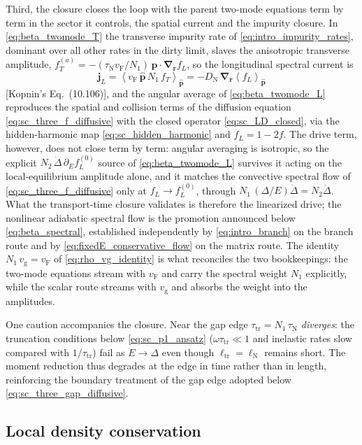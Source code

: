 \documentclass[
  aps,
  prb,
  preprint,
  superscriptaddress,
  longbibliography,
  nofootinbib
]{revtex4-2}
\newcommand{\avg}[1]{\left\langle #1 \right\rangle}
\newcommand{\br}{\mathbf{r}}
\newcommand{\bp}{\mathbf{p}}
\newcommand{\bnabla}{\boldsymbol{\nabla}}
\newcommand{\vF}{v_{\mathrm{F}}}
\newcommand{\vg}{v_{\mathrm{g}}}
\newcommand{\tautr}{\tau_{\mathrm{tr}}}
\newcommand{\elltr}{\ell_{\mathrm{tr}}}
\newcommand{\DOS}{N_1}
\newcommand{\DN}{D_{\mathrm{N}}}
\newcommand{\fL}{f_L}
\newcommand{\fT}{f_T}
\begin{document}
Third, the closure closes the loop with the parent two-mode equations
term by term in the sector it controls, the spatial current and the
impurity closure. In \cref{eq:beta_twomode_T} the transverse impurity rate
of \cref{eq:intro_impurity_rates}, dominant over all other rates in
the dirty limit, slaves the anisotropic transverse amplitude,
\(\fT^{(a)}=-(\tau_{\mathrm N}\vF/\DOS)\,\hat{\bp}\cdot\bnabla_{\br}\fL\),
so the longitudinal spectral current is
\begin{equation}
  \mathbf{j}_L
  =
  \avg{\vF\,\hat{\bp}\,\DOS\,\fT}_{\hat{\bp}}
  =
  -\DN\,\bnabla_{\br}\avg{\fL}_{\hat{\bp}}
  \label{eq:sc_kopnin_constitutive}
\end{equation}
[Kopnin's Eq.~(10.106)], and the angular average of
\cref{eq:beta_twomode_L} reproduces the spatial and collision terms of
the diffusion equation \cref{eq:sc_three_f_diffusive} with the closed
operator \cref{eq:sc_LD_closed}, via the hidden-harmonic map
\cref{eq:sc_hidden_harmonic} and \(\fL=1-2f\). The drive term, however,
does not close term by term: angular averaging is isotropic, so the
explicit \(N_2\,\dot\Delta\,\partial_E\fL^{(0)}\) source of
\cref{eq:beta_twomode_L} survives it acting on the local-equilibrium
amplitude alone, and it matches the convective spectral flow of
\cref{eq:sc_three_f_diffusive} only at \(\fL\to\fL^{(0)}\), through
\(\DOS\,(\Delta/E)\dot\Delta=N_2\dot\Delta\). What the transport-time
closure validates is therefore the linearized drive; the nonlinear
adiabatic spectral flow is the promotion announced below
\cref{eq:beta_spectral}, established independently by
\cref{eq:intro_branch} on the branch route and by
\cref{eq:fixedE_conservative_flow} on the matrix route. The identity
\(\DOS\,\vg=\vF\) of \cref{eq:rho_vg_identity} is what reconciles the
two bookkeepings: the two-mode equations stream with \(\vF\) and carry
the spectral weight \(\DOS\) explicitly, while the scalar route
streams with \(\vg\) and absorbs the weight into the amplitudes.

One caution accompanies the closure. Near the gap edge
\(\tautr=\DOS\,\tau_{\mathrm N}\) \emph{diverges}: the truncation
conditions below \cref{eq:sc_p1_ansatz} (\(\omega\tautr\ll1\) and
inelastic rates slow compared with \(1/\tautr\)) fail as
\(E\to\Delta\) even though \(\elltr=\ell_{\mathrm N}\) remains short.
The moment reduction thus degrades at the edge in time rather than in
length, reinforcing the boundary treatment of the gap edge adopted
below \cref{eq:sc_three_gap_diffusive}.

\subsection{Local density conservation}
\label{sec:conserved_density_ambiguity}
\end{document}
